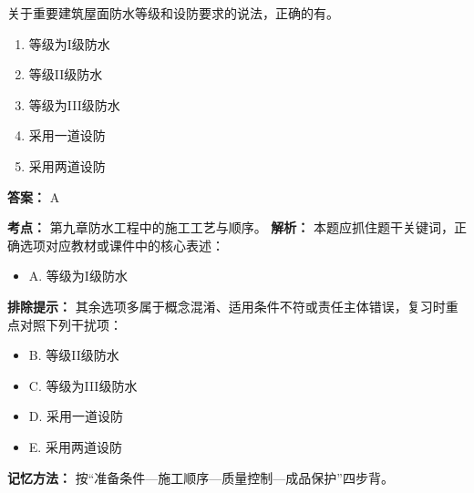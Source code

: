 \documentclass[UTF8,fontset=fandol,11pt]{ctexart}
\begin{document}
\begin{quizbox}[title={第 1 题}]
关于重要建筑屋面防水等级和设防要求的说法，正确的有。\\
\begin{enumerate}[label=\Alph*.]
\item 等级为I级防水
\item 等级II级防水
\item 等级为III级防水
\item 采用一道设防
\item 采用两道设防
\end{enumerate}
\textbf{答案：} A
\vspace{0.25em}
\begin{answerbox}[title={考点解析}]
\textbf{考点：} 第九章防水工程中的施工工艺与顺序。
\textbf{解析：} 本题应抓住题干关键词，正确选项对应教材或课件中的核心表述：
\begin{itemize}
\item A. 等级为I级防水
\end{itemize}
\textbf{排除提示：} 其余选项多属于概念混淆、适用条件不符或责任主体错误，复习时重点对照下列干扰项：
\begin{itemize}
\item B. 等级II级防水
\item C. 等级为III级防水
\item D. 采用一道设防
\item E. 采用两道设防
\end{itemize}
\textbf{记忆方法：} 按“准备条件—施工顺序—质量控制—成品保护”四步背。
\end{answerbox}
\end{quizbox}

\vspace{0.2em}
\end{document}
